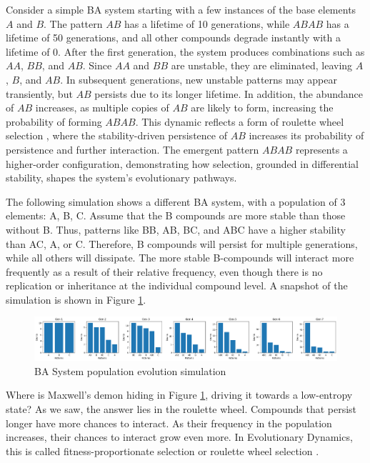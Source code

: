 \documentclass[preprint,12pt]{elsarticle}
\begin{document}
Consider a simple BA system starting with a few instances of the base elements \( A \) and \( B \). The pattern \( AB \) has a lifetime of 10 generations, while \( ABAB \) has a lifetime of 50 generations, and all other compounds degrade instantly with a lifetime of 0. After the first generation, the system produces combinations such as \( AA \), \( BB \), and \( AB \). Since \( AA \) and \( BB \) are unstable, they are eliminated, leaving \( A \), \( B \), and \( AB \). In subsequent generations, new unstable patterns may appear transiently, but \( AB \) persists due to its longer lifetime. In addition, the abundance of \( AB \) increases, as multiple copies of \( AB \) are likely to form, increasing the probability of forming \( ABAB \). This dynamic reflects a form of roulette wheel selection \cite{goldberg1989genetic} \cite{holland1975adaptation}, where the stability-driven persistence of \( AB \) increases its probability of persistence and further interaction. The emergent pattern \( ABAB \) represents a higher-order configuration, demonstrating how selection, grounded in differential stability, shapes the system's evolutionary pathways. 

The following simulation shows a different BA system, with a population of 3 elements: {A, B, C}. Assume that the B compounds are more stable than those without B. Thus, patterns like BB, AB, BC, and ABC have a higher stability than AC, A, or C. Therefore, B compounds will persist for multiple generations, while all others will dissipate. The more stable B-compounds will interact more frequently as a result of their relative frequency, even though there is no replication or inheritance at the individual compound level. A snapshot of the simulation is shown in Figure \ref{fig:figure_2}.

\begin{figure}[htp]
    \centering
    \includegraphics[width=1\textwidth]{figure_2}
    \caption{BA System population evolution simulation}
    \label{fig:figure_2}
\end{figure}

Where is Maxwell's demon \cite{leff2002maxwell} hiding in Figure \ref{fig:figure_2}, driving it towards a low-entropy state? As we saw, the answer lies in the roulette wheel. Compounds that persist longer have more chances to interact. As their frequency in the population increases, their chances to interact grow even more. In Evolutionary Dynamics, this is called fitness-proportionate selection \cite{back1996evolutionary} or roulette wheel selection \cite{goldberg1989genetic} \cite{holland1975adaptation}.
\end{document}
